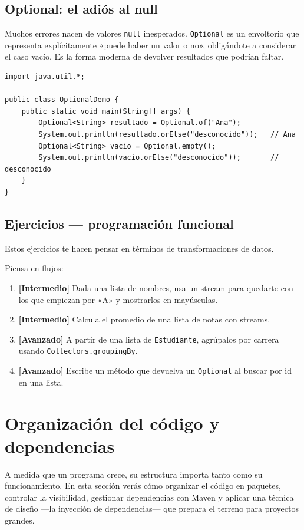 \documentclass[11pt]{article}
\begin{document}
\subsection{Optional: el adiós al null}
Muchos errores nacen de valores \texttt{null} inesperados. \texttt{Optional} es un envoltorio que representa explícitamente «puede haber un valor o no», obligándote a considerar el caso vacío. Es la forma moderna de devolver resultados que podrían faltar.

\begin{cajacodigo}
\begin{lstlisting}[style=java]
import java.util.*;

public class OptionalDemo {
    public static void main(String[] args) {
        Optional<String> resultado = Optional.of("Ana");
        System.out.println(resultado.orElse("desconocido"));   // Ana
        Optional<String> vacio = Optional.empty();
        System.out.println(vacio.orElse("desconocido"));       // desconocido
    }
}
\end{lstlisting}
\end{cajacodigo}
\vspace{2pt}
\subsection{Ejercicios — programación funcional}
Estos ejercicios te hacen pensar en términos de transformaciones de datos.

Piensa en flujos:

\begin{enumerate}[leftmargin=1.7em,itemsep=3pt,topsep=2pt]
\item \textbf{[Intermedio]} Dada una lista de nombres, usa un stream para quedarte con los que empiezan por «A» y mostrarlos en mayúsculas.
\item \textbf{[Intermedio]} Calcula el promedio de una lista de notas con streams.
\item \textbf{[Avanzado]} A partir de una lista de \texttt{Estudiante}, agrúpalos por carrera usando \texttt{Collectors.\allowbreak{}grouping\allowbreak{}By}.
\item \textbf{[Avanzado]} Escribe un método que devuelva un \texttt{Optional} al buscar por id en una lista.
\end{enumerate}
\section{Organización del código y dependencias}
A medida que un programa crece, su estructura importa tanto como su funcionamiento. En esta sección verás cómo organizar el código en paquetes, controlar la visibilidad, gestionar dependencias con Maven y aplicar una técnica de diseño —la inyección de dependencias— que prepara el terreno para proyectos grandes.
\end{document}

